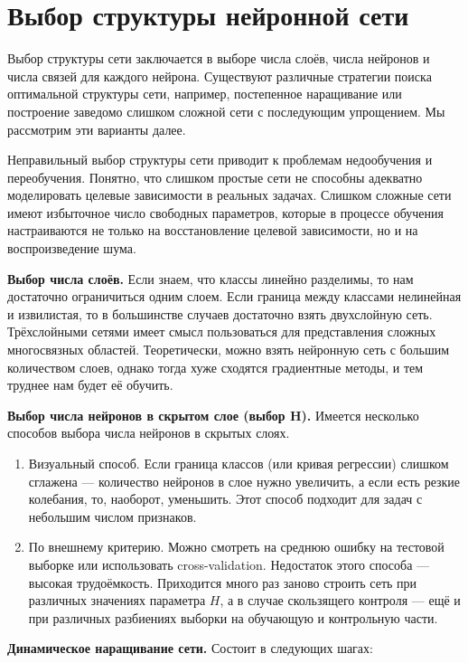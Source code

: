 \documentclass[specialist, 12pt, 
subf, %
href, colorlinks=true,
substylefile = spbu.rtx,
]{disser}
\begin{document}
\section{Выбор структуры нейронной сети}

Выбор структуры сети заключается в выборе числа слоёв, числа нейронов и числа связей для каждого нейрона. Существуют различные стратегии поиска оптимальной структуры сети, например, постепенное наращивание или построение заведомо слишком сложной сети с последующим упрощением. Мы рассмотрим эти варианты далее.

Неправильный выбор структуры сети приводит к проблемам недообучения и переобучения. Понятно, что слишком простые сети не способны адекватно моделировать целевые зависимости в реальных задачах. Слишком сложные сети имеют избыточное число свободных параметров, которые в процессе обучения настраиваются не только на восстановление целевой зависимости, но и на воспроизведение шума.

\textbf{Выбор числа слоёв.} Если знаем, что классы линейно разделимы, то нам достаточно ограничиться одним слоем. Если граница между классами нелинейная и извилистая, то в большинстве случаев достаточно взять двухслойную сеть. Трёхслойными сетями имеет смысл пользоваться для представления сложных многосвязных областей. Теоретически, можно взять нейронную сеть с большим количеством слоев, однако тогда хуже сходятся градиентные методы, и тем труднее нам будет её обучить.

\textbf{Выбор числа нейронов в скрытом слое (выбор H).} Имеется несколько способов выбора числа нейронов в скрытых слоях.
\begin{enumerate}
	\item Визуальный способ. Если граница классов (или кривая регрессии) слишком сглажена --- количество нейронов в слое нужно увеличить, а если есть резкие колебания, то, наоборот, уменьшить. Этот способ подходит для задач с небольшим числом признаков.
	\item По внешнему критерию. Можно смотреть на среднюю ошибку на тестовой выборке или использовать cross-validation. Недостаток этого способа --- высокая трудоёмкость. Приходится много раз заново строить сеть при различных значениях параметра $H$, а в случае скользящего контроля --- ещё и при различных разбиениях выборки на обучающую и контрольную части.
\end{enumerate}

\textbf{Динамическое наращивание сети.} Состоит в следующих шагах:
\end{document}
